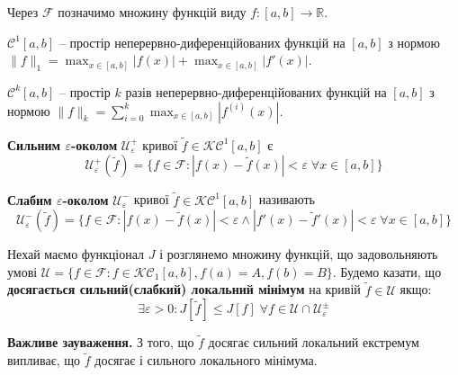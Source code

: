 \documentclass[14pt]{extarticle}
\newcommand{\<}{\langle}
\renewcommand{\>}{\rangle}
\theoremstyle{mystyle}{\newtheorem{definition}{Definition}[section]}
\theoremstyle{mystyle}{\newtheorem{proposition}[definition]{Proposition}}
\theoremstyle{mystyle}{\newtheorem{theorem}[definition]{Theorem}}
\theoremstyle{mystyle}{\newtheorem{lemma}[definition]{Lemma}}
\theoremstyle{mystyle}{\newtheorem{corollary}[definition]{Corollary}}
\theoremstyle{mystyle}{\newtheorem*{remark}{Remark}}
\theoremstyle{mystyle}{\newtheorem*{remarks}{Remarks}}
\theoremstyle{mystyle}{\newtheorem*{example}{Example}}
\theoremstyle{mystyle}{\newtheorem*{examples}{Examples}}
\theoremstyle{definition}{\newtheorem*{exercise}{Exercise}}
\theoremstyle{cstyle}{\newtheorem*{cthm}{}}
\theoremstyle{warn}
\begin{document}
Через $\mathcal{F}$ позначимо множину функцій виду $f: [a,b] \to \mathbb{R}$.

\begin{definition} $\mathcal{C}^1[a,b]$ -- простір неперервно-диференційованих функцій на $[a,b]$ з нормою $\|f\|_1=\max_{x \in [a,b]}|f(x)|+\max_{x \in [a,b]}|f'(x)|$.
\end{definition}

\begin{definition} $\mathcal{C}^k[a,b]$ -- простір $k$ разів неперервно-диференційованих функцій на $[a,b]$ з нормою $\|f\|_k=\sum_{i=0}^k\max_{x \in [a,b]}|f^{(i)}(x)|$.
\end{definition}

\begin{definition} \textbf{Сильним $\varepsilon$-околом} $\mathcal{U}_{\varepsilon}^+$ кривої $\widetilde{f} \in \mathcal{KC}^1[a,b]$ є
\begin{equation}
    \mathcal{U}_{\varepsilon}^+(\widetilde{f}) = \{f \in \mathcal{F}: |f(x) - \widetilde{f}(x)| < \varepsilon \; \forall x \in [a,b]\}
\end{equation}
\end{definition}

\begin{definition} \textbf{Слабим $\varepsilon$-околом} $\mathcal{U}_{\varepsilon}^-$ кривої $\widetilde{f} \in \mathcal{KC}^1[a,b]$ називають
\begin{equation}
    \mathcal{U}_{\varepsilon}^-(\widetilde{f}) = \{f \in \mathcal{F}: |f(x) - \widetilde{f}(x)| < \varepsilon \wedge |f'(x)-\widetilde{f}'(x)|<\varepsilon \; \forall x \in [a,b]\}
\end{equation}
\end{definition}

\begin{definition} Нехай маємо функціонал $J$ і розглянемо множину функцій, що задовольняють умові $\mathcal{U} = \{f \in \mathcal{F}: f \in \mathcal{KC}_1[a,b], f(a)=A,f(b)=B\}$. Будемо казати, що \textbf{досягається сильний(слабкий) локальний мінімум} на кривій $\widetilde{f} \in \mathcal{U}$ якщо:
    \begin{equation}
        \exists \varepsilon > 0: J[\widetilde{f}] \leq J[f] \; \forall f \in \mathcal{U} \cap \mathcal{U}_{\varepsilon}^{\pm}
    \end{equation}
\end{definition}

\textbf{Важливе зауваження.} З того, що $\widetilde{f}$ досягає сильний локальний екстремум випливає, що $\widetilde{f}$ досягає і сильного локального мінімума.
 
\end{document}
